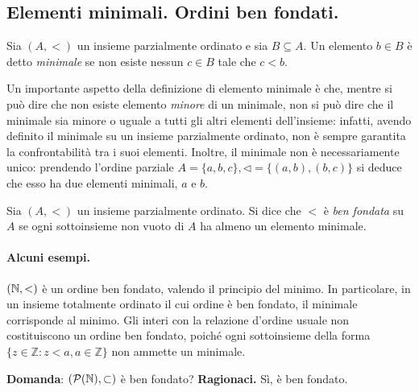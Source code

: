 \subsection{Elementi minimali. Ordini ben fondati.}
\begin{dfn}
  Sia \((A, <)\) un insieme parzialmente ordinato e sia \(B \subseteq A\). Un elemento \(b \in B\) è detto \emph{minimale} se non esiste nessun \(c \in B\) tale che \(c < b\).
\end{dfn}
Un importante aspetto della definizione di elemento minimale è che, mentre si può dire che non esiste elemento \emph{minore} di un minimale, non si può dire che il minimale sia minore o uguale a tutti gli altri elementi dell'insieme: infatti, avendo definito il minimale su un insieme parzialmente ordinato, non è sempre garantita la confrontabilità tra i suoi elementi. Inoltre, il minimale non è necessariamente unico: prendendo l'ordine parziale \(A = \lbrace a,b,c \rbrace, \lhd = \lbrace (a,b), (b,c) \rbrace\) si deduce che esso ha due elementi minimali, \(a\) e \(b\).

\begin{dfn}
  Sia \((A,<)\) un insieme parzialmente ordinato. Si dice che \(<\) è \emph{ben fondata} su \(A\) se ogni sottoinsieme non vuoto di \(A\) ha almeno un elemento minimale.
\end{dfn}

\paragraph{Alcuni esempi.} \((\mathbb{N}, <)\) è un ordine ben fondato, valendo il principio del minimo. In particolare, in un insieme totalmente ordinato il cui ordine è ben fondato, il minimale corrisponde al minimo. Gli interi con la relazione d'ordine usuale non costituiscono un ordine ben fondato, poiché ogni sottoinsieme della forma \(\lbrace z \in \mathbb{Z} \colon z < a, a \in \mathbb{Z}\rbrace\) non ammette un minimale.

\begin{exe}
{\bf Domanda}: \((\mathcal{P}(\mathbb{N}), \subset)\) è ben fondato?
{\bf Ragionaci.} Sì, è ben fondato.
\end{exe}

